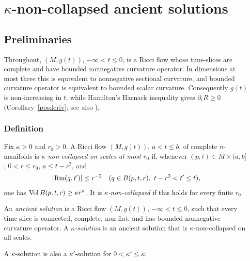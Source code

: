 \chapter{$\kappa$-non-collapsed ancient solutions}\label{chap:kappa-ancient-solutions}
\label{kappasect}

\section{Preliminaries}

Throughout, $(M,g(t))$, $-\infty<t\leq0$, is a Ricci flow whose
time-slices are complete and have bounded nonnegative curvature operator.
In dimensions at most three this is equivalent to nonnegative sectional
curvature, and bounded curvature operator is equivalent to bounded scalar
curvature. Consequently $g(t)$ is non-increasing in $t$, while Hamilton's
Harnack inequality gives $\partial_tR\geq0$ (Corollary~\ref{posderiv};
see also \cite{Hamiltonharnack}).

\subsection{Definition}

\begin{definition}\label{def:kappa-noncollapsed}
\label{kappadefn}

Fix $\kappa>0$ and $r_0>0$. A Ricci flow $(M,g(t))$, $a<t\leq b$,
of complete $n$-manifolds is \emph{$\kappa$-non-collapsed on scales at
most $r_0$} if, whenever $(p,t)\in M\times(a,b]$, $0<r\leq r_0$,
$a\leq t-r^2$, and
\[
 |\operatorname{Rm}(q,t')|\leq r^{-2}
 \quad(q\in B(p,t,r),\ t-r^2<t'\leq t),
\]
one has $\operatorname{Vol} B(p,t,r)\geq\kappa r^n$. It is
\emph{$\kappa$-non-collapsed} if this holds for every finite $r_0$.
\end{definition}

\begin{definition}\label{def:ancient-solution}

An \emph{ancient solution} is a Ricci flow $(M,g(t))$,
$-\infty<t\leq0$, such that every time-slice is connected, complete,
non-flat, and has bounded nonnegative curvature operator. A
\emph{$\kappa$-solution} is an ancient solution that is
$\kappa$-non-collapsed on all scales.
\end{definition}

A $\kappa$-solution is also a $\kappa'$-solution for
$0<\kappa'\leq\kappa$.

